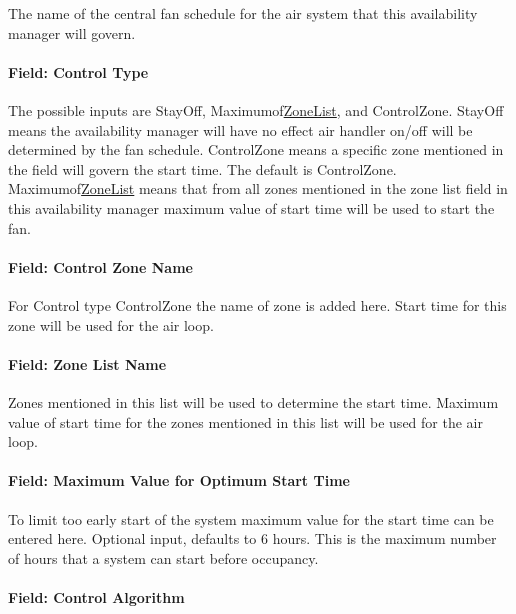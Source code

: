 The name of the central fan schedule for the air system that this availability manager will govern.

\paragraph{Field: Control Type}\label{field-control-type-003}

The possible inputs are StayOff, Maximumof\hyperref[zonelist]{ZoneList}, and ControlZone. StayOff means the availability manager will have no effect air handler on/off will be determined by the fan schedule. ControlZone means a specific zone mentioned in the field will govern the start time. The default is ControlZone. Maximumof\hyperref[zonelist]{ZoneList} means that from all zones mentioned in the zone list field in this availability manager maximum value of start time will be used to start the fan.

\paragraph{Field: Control Zone Name}\label{field-control-zone-name-1-000}

For Control type ControlZone the name of zone is added here. Start time for this zone will be used for the air loop.

\paragraph{Field: Zone List Name}\label{field-zone-list-name}

Zones mentioned in this list will be used to determine the start time. Maximum value of start time for the zones mentioned in this list will be used for the air loop.

\paragraph{Field: Maximum Value for Optimum Start Time}\label{field-maximum-value-for-optimum-start-time}

To limit too early start of the system maximum value for the start time can be entered here. Optional input, defaults to 6 hours. This is the maximum number of hours that a system can start before occupancy.

\paragraph{Field: Control Algorithm}\label{field-control-algorithm}

